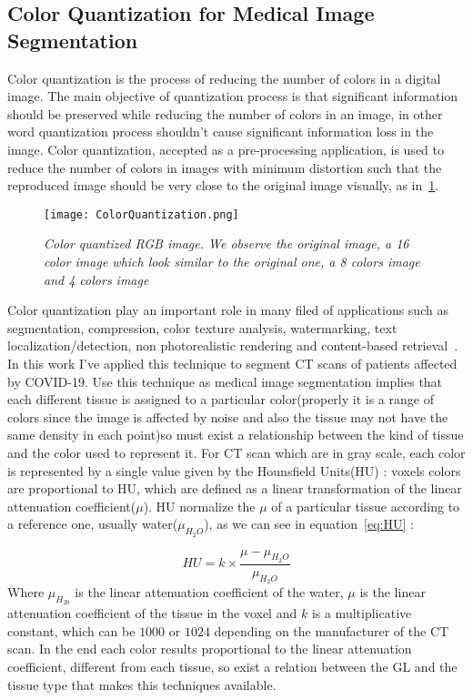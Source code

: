 \documentclass{standalone}
\begin{document}
	\subsection{Color Quantization for Medical Image Segmentation}
	

	Color quantization is the process of reducing the number of colors in a digital image. The main objective of quantization process is that 
	significant information should be preserved while reducing the number of colors in an image, in other word quantization process shouldn’t cause 
	significant information loss in the image. 
	Color quantization, accepted as a pre-processing application, is used to reduce the number of colors in images with minimum distortion such that the 
	reproduced image should be very close to the original image visually, as in \figurename\,\ref{fig:ColorQuantization}. 

	\begin{figure}[h!]
		
		\centering
			\texttt{[image: ColorQuantization.png]}
		\label{fig:ColorQuantization}\caption{\textit{Color quantized RGB image. We observe the original image, a 16 color image which look similar to the original one, a 8 colors image and 4 colors image}}
	\end{figure}

	Color quantization play an important role in many filed of applications such as segmentation, compression, color texture analysis, watermarking, 
	text localization/detection, non photorealistic rendering and content-based retrieval~\cite{ART:Ozturk}.\\
	
	
	In this work I've applied this technique to segment CT scans of patients affected by COVID-19. Use this technique as medical image segmentation implies that each different tissue is assigned to a particular color(properly it is a range of colors since the image is affected by noise and also the tissue may not have the same density in each point)so must exist a relationship between the kind of tissue and the color used to represent it. 
	For CT scan which are in gray scale, each color is represented by a single value given by the Hounsfield Units(HU) : voxels colors are proportional to HU, which are defined as a linear transformation of the linear attenuation coefficient($\mu$). HU normalize the $\mu$ of a particular tissue according to a reference one, usually water($\mu_{H_2 O}$), as we can see in equation \,\ref{eq:HU} : 
	
	\begin{equation}\label{eq:HU}
		HU = k\times\frac{\mu - \mu_{H_2 O}}{\mu_{H_2 O}}
	\end{equation}
	Where $\mu_{H_20}$ is the linear attenuation coefficient of the water, $\mu$ is the linear attenuation coefficient of the tissue in the voxel and $k$ is a multiplicative constant, which can be $1000$ or $1024$ depending on the manufacturer of the CT scan.	
	In the end each color results proportional to the linear attenuation coefficient, different from each tissue, so exist a relation between the GL and the tissue type that makes this techniques available. \\
	
\end{document}
